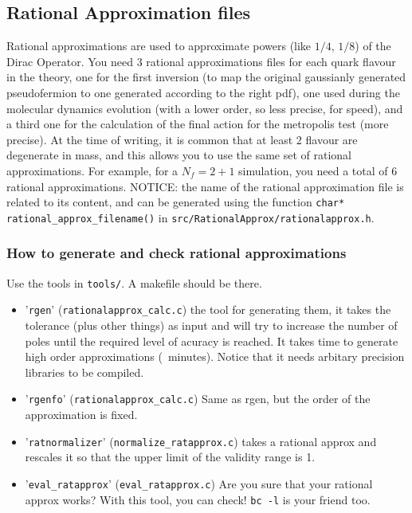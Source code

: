 \subsection{ Rational Approximation files}
Rational approximations are used to approximate powers (like $1/4$,
$1/8$) of the Dirac Operator.
You need $3$ rational approximations files for each quark flavour in the
theory, one for the first inversion (to map the original
gaussianly generated pseudofermion to one generated according to the
right pdf), one used during the molecular dynamics evolution (with a
lower order, so less precise, for speed), and a third one for the
calculation of the final action for the metropolis test (more
precise). At the time of writing, it is common that at least 2 flavour are 
degenerate in mass, and this allows you to use the same set of rational
approximations. For example, for a $N_f=2+1$ simulation, you need a total
of 6 rational approximations.
NOTICE: the name of the rational approximation file is related to
its content, and can be generated using the function
\verb|char* rational_approx_filename()| in
\verb|src/RationalApprox/rationalapprox.h|.

\subsubsection{ How to generate and check rational approximations}
Use the tools in \verb|tools/|. A makefile should be there. 
\begin{itemize}
    \item '\verb|rgen|' (\verb|rationalapprox_calc.c|) 
        the tool for generating them, it takes the tolerance (plus other
        things) as input and will try to increase the number of poles until
        the required level of acuracy is reached. It takes time to generate
        high order approximations (~minutes). Notice that it needs arbitary
        precision libraries to be compiled.
    \item '\verb|rgenfo|' (\verb|rationalapprox_calc.c|) 
        Same as rgen, but the order of the approximation is fixed.
    \item '\verb|ratnormalizer|' (\verb|normalize_ratapprox.c|) 
        takes a rational approx and
        rescales it so that the upper limit of the validity range is 1.
    \item '\verb|eval_ratapprox|' (\verb|eval_ratapprox.c|)
        Are you sure that your rational approx works? With this tool, you
        can check! \verb|bc -l| is your friend too.
\end{itemize}

